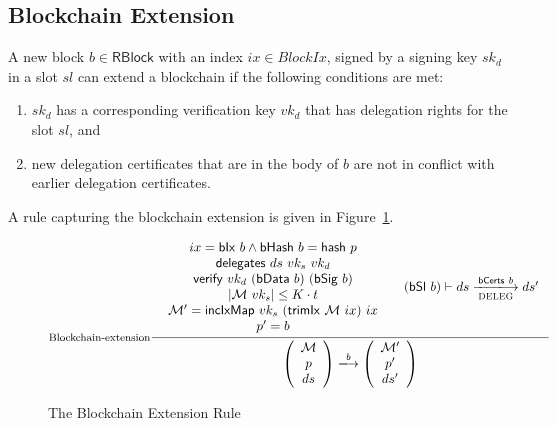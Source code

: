 \documentclass[11pt,a4paper]{article}
\newcommand{\fun}[1]{\mathsf{#1}}
\newcommand{\type}[1]{\mathsf{#1}}
\newcommand{\size}[1]{\left| #1 \right|}
\newcommand{\trans}[2]{\xlongrightarrow[\textsc{#1}]{#2}}
\newcommand{\RBlock}{\type{RBlock}}
\newcommand{\hashname}{bHash}
\newcommand{\verifyname}{verify}
\newcommand{\delegationname}{delegates} %
\newcommand{\signmapname}{\mathcal{M}}
\newcommand{\trimixname}{trimIx}
\newcommand{\incixmapname}{incIxMap}
\newcommand{\hashofblockname}{hash}
\newcommand{\bdataname}{bData}
\newcommand{\bcertsname}{bCerts}
\newcommand{\bsigname}{bSig}
\newcommand{\bixname}{bIx}
\newcommand{\bslname}{bSl}
\newcommand{\verify}[3]{\fun{\verifyname} ~ #1 ~ #2 ~ #3}
\newcommand{\hash}[1]{\fun{\hashname}\ #1}
\newcommand{\delegation}[3]{\fun{\delegationname} ~ #1 ~ #2 ~#3}
\newcommand{\signmap}[1]{\fun{\signmapname} ~ #1}
\newcommand{\trimix}[2]{\fun{\trimixname} ~ #1 ~ #2}
\newcommand{\incixmap}[3]{\fun{\incixmapname} ~ #1 ~ #2 ~ #3}
\newcommand{\hashofblock}[1]{\fun{\hashofblockname} ~ #1}
\newcommand{\bdata}[1]{\fun{\bdataname} ~ #1}
\newcommand{\bcerts}[1]{\fun{\bcertsname} ~ #1}
\newcommand{\bsig}[1]{\fun{\bsigname} ~ #1}
\newcommand{\bix}[1]{\fun{\bixname} ~ #1}
\newcommand{\bsl}[1]{\fun{\bslname} ~ #1}
\begin{document}
\subsection{Blockchain Extension}
\label{sec:chain-extension}

A new block $b \in \RBlock$ with an index $ix \in BlockIx$, signed by a
signing key $sk_d$ in a slot $sl$ can extend a blockchain if the following
conditions are met:
%
\begin{enumerate}
\item $sk_d$ has a corresponding verification key $vk_d$ that has delegation
  rights for the slot $sl$, and
\item new delegation certificates that are in the body of $b$ are not in
  conflict with earlier delegation certificates.
\end{enumerate}

A rule capturing the blockchain extension is given in
Figure~\ref{fig:blockchain-extension}.

\begin{figure}
  \begin{equation*}
  \inference[Blockchain-extension]
  {
    {\begin{array}{c}
      ix = \bix{b} \wedge \hash{b} = \hashofblock{p} \\
      \delegation{ds}{vk_s}{vk_d} \\
      \verify{vk_d}{(\bdata{b})}{(\bsig{b})} \\
      \size{\signmap{vk_s}} \leq K \cdot t \\
      \signmapname' = \incixmap{vk_s}{(\trimix{\signmapname}{ix})}{ix} \\
      p' = b 
     \end{array}}
   & (\bsl{b}) \vdash ds \trans{\text{DELEG}}{\bcerts{b}} ds'
  }
  {
    \left(
      {\begin{array}{c}
         \signmapname \\
         p \\
         ds
       \end{array}}
    \right)
    \trans{}{b}
    \left(
      {\begin{array}{c}
         \signmapname' \\
         p' \\
         ds'
       \end{array}}
    \right)
 }
  \end{equation*}
  \caption{The Blockchain Extension Rule}
  \label{fig:blockchain-extension}
\end{figure}
\end{document}
